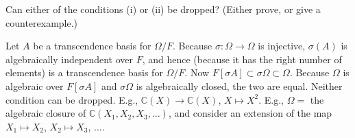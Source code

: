 \documentclass[a4paper,11pt,final,openany]{memoir}
\theoremstyle{nonumberplain}
\begin{document}
Can either of the conditions (i) or (ii) be dropped? (Either prove, or give a counterexample.)

Let $A$ be a transcendence basis for $\Omega/F$. Because $\sigma\colon
\Omega\rightarrow\Omega$ is injective, $\sigma(A)$ is algebraically
independent over $F$, and hence (because it has the right number of elements)
is a transcendence basis for $\Omega/F$. Now $F[\sigma A]\subset\sigma
\Omega\subset\Omega$. Because $\Omega$ is algebraic over $F[\sigma A]$ and
$\sigma\Omega$ is algebraically closed, the two are equal. Neither condition
can be dropped. E.g., $\mathbb{C}(X)\mathbb{\rightarrow C}(X)$, $X\mapsto
X^{2}$. E.g., $\Omega=$ the algebraic closure of $\mathbb{C}(X_{1},X_{2}%
,X_{3},\ldots)$, and consider an extension of the map $X_{1}\mapsto X_{2}$,
$X_{2}\mapsto X_{3}$, $\ldots$.\clearpage%

\footnotesize


\printindex
\end{document}
